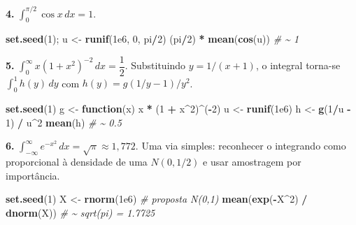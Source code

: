 \documentclass[
  portuguese,
  11pt,
  openany]{book}
\newenvironment{Shaded}{\begin{snugshade}}{\end{snugshade}}
\newcommand{\CommentTok}[1]{\textcolor[rgb]{0.56,0.35,0.01}{\textit{#1}}}
\newcommand{\ControlFlowTok}[1]{\textcolor[rgb]{0.13,0.29,0.53}{\textbf{#1}}}
\newcommand{\DecValTok}[1]{\textcolor[rgb]{0.00,0.00,0.81}{#1}}
\newcommand{\FloatTok}[1]{\textcolor[rgb]{0.00,0.00,0.81}{#1}}
\newcommand{\FunctionTok}[1]{\textcolor[rgb]{0.13,0.29,0.53}{\textbf{#1}}}
\newcommand{\NormalTok}[1]{#1}
\newcommand{\OtherTok}[1]{\textcolor[rgb]{0.56,0.35,0.01}{#1}}
\newcommand{\SpecialCharTok}[1]{\textcolor[rgb]{0.81,0.36,0.00}{\textbf{#1}}}
\begin{document}
\textbf{4.} \(\int_0^{\pi/2} \cos x\,dx = 1\).

\begin{Shaded}
\begin{Highlighting}[]
\FunctionTok{set.seed}\NormalTok{(}\DecValTok{1}\NormalTok{); u }\OtherTok{\textless{}{-}} \FunctionTok{runif}\NormalTok{(}\FloatTok{1e6}\NormalTok{, }\DecValTok{0}\NormalTok{, pi}\SpecialCharTok{/}\DecValTok{2}\NormalTok{)}
\NormalTok{(pi}\SpecialCharTok{/}\DecValTok{2}\NormalTok{) }\SpecialCharTok{*} \FunctionTok{mean}\NormalTok{(}\FunctionTok{cos}\NormalTok{(u))      }\CommentTok{\# \textasciitilde{} 1}
\end{Highlighting}
\end{Shaded}

\textbf{5.} \(\int_0^{\infty} x(1+x^2)^{-2}\,dx = \dfrac12\). Substituindo
\(y = 1/(x+1)\), o integral torna-se \(\int_0^1 h(y)\,dy\) com
\(h(y) = g(1/y - 1)/y^2\).

\begin{Shaded}
\begin{Highlighting}[]
\FunctionTok{set.seed}\NormalTok{(}\DecValTok{1}\NormalTok{)}
\NormalTok{g }\OtherTok{\textless{}{-}} \ControlFlowTok{function}\NormalTok{(x) x }\SpecialCharTok{*}\NormalTok{ (}\DecValTok{1} \SpecialCharTok{+}\NormalTok{ x}\SpecialCharTok{\^{}}\DecValTok{2}\NormalTok{)}\SpecialCharTok{\^{}}\NormalTok{(}\SpecialCharTok{{-}}\DecValTok{2}\NormalTok{)}
\NormalTok{u }\OtherTok{\textless{}{-}} \FunctionTok{runif}\NormalTok{(}\FloatTok{1e6}\NormalTok{)}
\NormalTok{h }\OtherTok{\textless{}{-}} \FunctionTok{g}\NormalTok{(}\DecValTok{1}\SpecialCharTok{/}\NormalTok{u }\SpecialCharTok{{-}} \DecValTok{1}\NormalTok{) }\SpecialCharTok{/}\NormalTok{ u}\SpecialCharTok{\^{}}\DecValTok{2}
\FunctionTok{mean}\NormalTok{(h)                    }\CommentTok{\# \textasciitilde{} 0.5}
\end{Highlighting}
\end{Shaded}

\textbf{6.} \(\int_{-\infty}^{\infty} e^{-x^2}\,dx = \sqrt{\pi} \approx 1{,}772\). Uma
via simples: reconhecer o integrando como proporcional à densidade de uma
\(N(0, 1/2)\) e usar amostragem por importância.

\begin{Shaded}
\begin{Highlighting}[]
\FunctionTok{set.seed}\NormalTok{(}\DecValTok{1}\NormalTok{)}
\NormalTok{X }\OtherTok{\textless{}{-}} \FunctionTok{rnorm}\NormalTok{(}\FloatTok{1e6}\NormalTok{)                       }\CommentTok{\# proposta N(0,1)}
\FunctionTok{mean}\NormalTok{(}\FunctionTok{exp}\NormalTok{(}\SpecialCharTok{{-}}\NormalTok{X}\SpecialCharTok{\^{}}\DecValTok{2}\NormalTok{) }\SpecialCharTok{/} \FunctionTok{dnorm}\NormalTok{(X))            }\CommentTok{\# \textasciitilde{} sqrt(pi) = 1.7725}
\end{Highlighting}
\end{Shaded}
\end{document}

